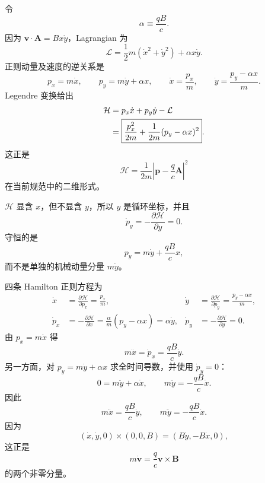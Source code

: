 \begin{checkedsolution}
令
\[
  \alpha\equiv\frac{qB}{c}.
\]
因为 $\bm v\cdot\bm A=Bx\dot y$，Lagrangian 为
\begin{equation}
  \mathcal L
  =\frac12m(\dot x^2+\dot y^2)+\alpha x\dot y.
  \label{eq:QM-C02-S06-E01-lagrangian}
\end{equation}
正则动量及速度的逆关系是
\begin{equation}
  p_x=m\dot x,
  \qquad
  p_y=m\dot y+\alpha x,
  \qquad
  \dot x=\frac{p_x}{m},
  \qquad
  \dot y=\frac{p_y-\alpha x}{m}.
  \label{eq:QM-C02-S06-E01-momenta}
\end{equation}
Legendre 变换给出
\begin{align}
  \mathcal H
  &=p_x\dot x+p_y\dot y-\mathcal L \notag\\
  &=\boxed{
    \frac{p_x^2}{2m}
    +\frac1{2m}(p_y-\alpha x)^2}.
  \label{eq:QM-C02-S06-E01-hamiltonian}
\end{align}
这正是
\[
  \mathcal H
  =\frac1{2m}
  \left|\bm p-\frac qc\bm A\right|^2
\]
在当前规范中的二维形式。

$\mathcal H$ 显含 $x$，但不显含 $y$，所以 $y$ 是循环坐标，并且
\begin{equation}
  \dot p_y
  =-\frac{\partial\mathcal H}{\partial y}=0.
  \label{eq:QM-C02-S06-E01-conserved-py}
\end{equation}
守恒的是
\[
  p_y=m\dot y+\frac{qB}{c}x,
\]
而不是单独的机械动量分量 $m\dot y$。

四条 Hamilton 正则方程为
\begin{align}
  \dot x
  &=\frac{\partial\mathcal H}{\partial p_x}
    =\frac{p_x}{m},
  &
  \dot y
  &=\frac{\partial\mathcal H}{\partial p_y}
    =\frac{p_y-\alpha x}{m},
  \label{eq:QM-C02-S06-E01-coordinate-equations}\\
  \dot p_x
  &=-\frac{\partial\mathcal H}{\partial x}
    =\frac{\alpha}{m}(p_y-\alpha x)
    =\alpha\dot y,
  &
  \dot p_y
  &=-\frac{\partial\mathcal H}{\partial y}=0.
  \label{eq:QM-C02-S06-E01-momentum-equations}
\end{align}
由 $p_x=m\dot x$ 得
\begin{equation}
  m\ddot x=\dot p_x
  =\frac{qB}{c}\dot y.
  \label{eq:QM-C02-S06-E01-x-equation}
\end{equation}
另一方面，对 $p_y=m\dot y+\alpha x$ 求全时间导数，并使用 $\dot p_y=0$：
\begin{equation}
  0=m\ddot y+\alpha\dot x,
  \qquad
  m\ddot y=-\frac{qB}{c}\dot x.
  \label{eq:QM-C02-S06-E01-y-equation}
\end{equation}
因此
\begin{equation}
  \boxed{
  m\ddot x=\frac{qB}{c}\dot y,
  \qquad
  m\ddot y=-\frac{qB}{c}\dot x.}
  \label{eq:QM-C02-S06-E01-lorentz-equations}
\end{equation}
因为
\[
  (\dot x,\dot y,0)\times(0,0,B)
  =(B\dot y,-B\dot x,0),
\]
这正是
\[
  m\dot{\bm v}=\frac qc\bm v\times\bm B
\]
的两个非零分量。
\end{checkedsolution}

